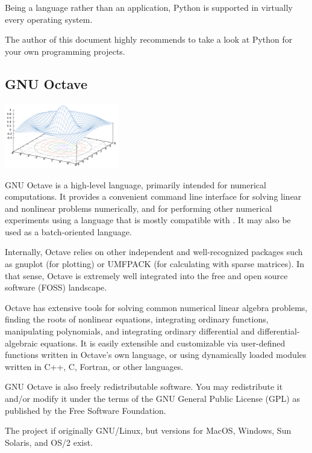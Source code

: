 Being a language rather than an application, Python is supported in virtually every operating system.

The author of this document highly recommends to take a look at Python for your own
programming projects.



\subsection{GNU Octave}

\begin{floatingfigure}[r]{5cm}
\centering
\includegraphics[width=5cm]{figures/Octave_Sombrero}
\end{floatingfigure}

GNU Octave is a high-level language, primarily intended for numerical computations. It provides a convenient command line interface for solving linear and nonlinear problems numerically, and for performing other numerical experiments using a language that is mostly compatible with \matlab{}. It may also be used as a batch-oriented language.

Internally, Octave relies on other independent and well-recognized packages such as gnuplot (for plotting) or UMFPACK (for calculating with sparse matrices). In that sense, Octave is extremely well integrated into the free and open source software (FOSS) landscape.

Octave has extensive tools for solving common numerical linear algebra problems, finding the roots of nonlinear equations, integrating ordinary functions, manipulating polynomials, and integrating ordinary differential and differential-algebraic equations. It is easily extensible and customizable via user-defined functions written in Octave's own language, or using dynamically loaded modules written in C++, C, Fortran, or other languages.

GNU Octave is also freely redistributable software. You may redistribute it and/or modify it under the terms of the GNU General Public License (GPL) as published by the Free Software Foundation.

The project if originally GNU/Linux, but versions for MacOS, Windows, Sun Solaris, and OS/2 exist.

